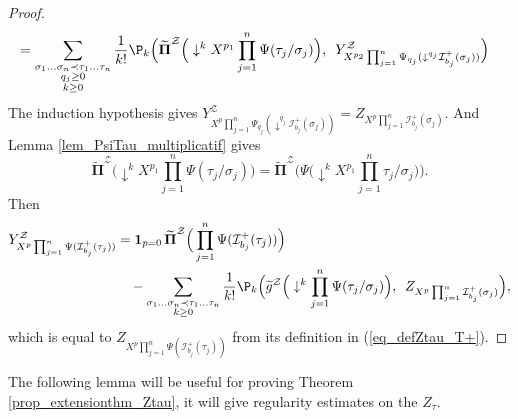 \documentclass[11pt]{preprint}
\newcommand{\mcI}{\mathcal{I}}
\newcommand{\mcZ}{\mathcal{Z}}
\def\PPi{\boldsymbol{\Pi}}
\def\eqref#1{(\ref{#1})}
\begin{document}
\begin{proof}
\begin{align*}
			 &=\sum_{\substack{\sigma_1\dots\sigma_n\prec\tau_1\dots\tau_n \\q_j \geq 0 \\ k\geq0 }} \frac{1}{k!}\P_k\Big(  \widetilde{ \PPi}^\mcZ\Big( \downarrow^k X^{p_1} \prod_{j=1}^n\Psi( \tau_j/\sigma_j )   \Big) ,\enskip  Y^\mcZ_{X^{p_2}\prod_{j=1}^n\Psi_{q_j}(\downarrow^{q_j}\mcI^+_{b_j}(\sigma_j)) }  \Big)
		\end{align*}
	The induction hypothesis gives $Y^\mcZ_{X^p\prod_{j=1}^n\Psi_{q_j}(\downarrow^{q_j}\mcI^+_{b_j}(\sigma_j)) } = Z_{{X^p\prod_{j=1}^n\mcI^+_{b_j}(\sigma_j) }}$. And Lemma \ref{lem_PsiTau_multiplicatif} gives
	$$
	\widetilde{\PPi}^\mcZ\Big( \downarrow^k X^{p_1} \prod_{j=1}^n\Psi( \tau_j/\sigma_j )\Big)  = \widetilde{ \PPi}^\mcZ\Big( \Psi\Big(\downarrow^k X^{p_1} \prod_{j=1}^n \tau_j/\sigma_j \Big)\Big).
	$$
	Then 
	\begin{align*}
		Y_{X^p\prod_{j=1}^n\Psi(\mcI^+_{b_j}(\tau_j))}^\mcZ &= \mathbf{1}_{p=0} \, \widetilde{\PPi}^\mcZ\Big( \prod_{j=1}^n\Psi(\mcI^+_{b_j}(\tau_j)) \Big) 
		\\
		&\quad- \sum_{\substack{\sigma_1\dots\sigma_n\prec\tau_1\dots\tau_n \\ k\geq0 }} \frac{1}{k!}\P_k\Big(  \widetilde{ g}^\mcZ\Big( \downarrow^k \prod_{j=1}^n \Psi(\tau_j/\sigma_j)    \Big) ,\enskip  Z_{{X^p\prod_{j=1}^n\mcI^+_{b_j}(\sigma_j) }}  \Big),
	\end{align*} 
	which is equal to $Z_{X^p\prod_{j=1}^n\Psi(\mcI^+_{b_j}(\tau_j))}$ from its definition in \eqref{eq_defZtau_T+}.
\end{proof}


The following lemma will be useful for proving Theorem \ref{prop_extensionthm_Ztau}, it will give regularity estimates on the $Z_\tau$. 
\end{document}
